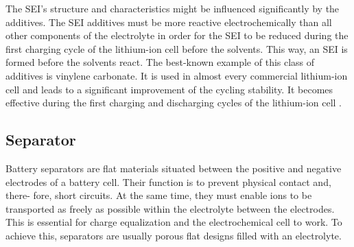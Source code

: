 The SEI's structure and characteristics might be influenced significantly by the additives. The SEI additives must be more reactive electrochemically than all other components of the electrolyte in order for the SEI to be reduced during the first charging cycle of the lithium-ion cell before the solvents. This way, an SEI is formed before the solvents react.
The best-known example of this class of additives is vinylene carbonate. It is used in almost every commercial lithium-ion cell and leads to a significant improvement of the cycling stability. It becomes effective during the first charging and discharging cycles of the lithium-ion cell \cite{xu2004nonaqueous}.

\subsection{Separator}
\label{sec:separator}
Battery separators are flat materials situated between the positive and negative electrodes of a battery cell. Their function is to prevent physical contact and, there- fore, short circuits. At the same time, they must enable ions to be transported as freely as possible within the electrolyte between the electrodes. This is essential for charge equalization and the electrochemical cell to work. To achieve this, separators are usually porous flat designs filled with an electrolyte.

